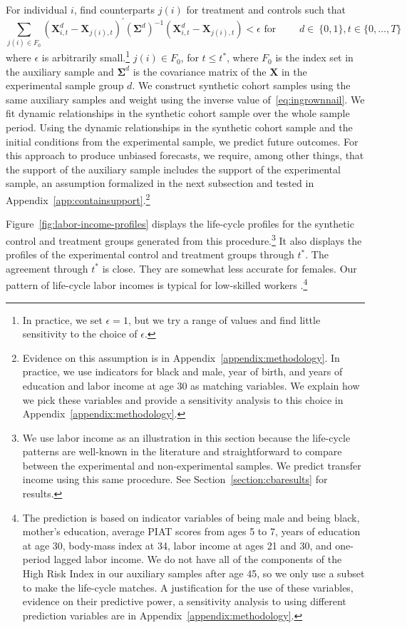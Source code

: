 For individual $i$, find counterparts $j(i)$ for treatment and controls such that
\begin{equation}\label{eq:ingrownnail}
\sum_{j(i)\in F_0} \left( \bm{X}^{d}_{i,t} - \bm{X}_{j(i),t} \right)^{\prime} {\left( \bm{\Sigma}^d\right)}^{-1} \left(\bm{X}^{d}_{i,t} - \bm{X}_{j(i),t} \right) < \epsilon \text{ for } \qquad d \in \ \{0,1\}, t \in \{0,\dots,T\}
\end{equation}
where $\epsilon$ is arbitrarily small.\footnote{In practice, we set $\epsilon = 1$, but we try a range of values and find little sensitivity to the choice of $\epsilon$.} $j(i) \in F_0$, for $t \leq t^{\ast}$, where $F_0$ is the index set in the auxiliary sample and $\bm{\Sigma}^d$ is the covariance matrix of the $\bm{X}$ in the experimental sample group $d$. We construct synthetic cohort samples using the same auxiliary samples and weight using the inverse value of~\eqref{eq:ingrownnail}. We fit dynamic relationships in the synthetic cohort sample over the whole sample period. Using the dynamic relationships in the synthetic cohort sample and the initial conditions from the experimental sample, we predict future outcomes. For this approach to produce unbiased forecasts, we require, among other things, that the support of the auxiliary sample includes the support of the experimental sample, an assumption formalized in the next subsection and tested in Appendix~\ref{app:containsupport}.\footnote{Evidence on this assumption is in Appendix~\ref{appendix:methodology}. In practice, we use indicators for black and male, year of birth, and years of education and labor income at age 30 as matching variables. We explain how we pick these variables and provide a sensitivity analysis to this choice in Appendix~\ref{appendix:methodology}.}

Figure~\ref{fig:labor-income-profiles} displays the life-cycle profiles for the synthetic control and treatment groups generated from this procedure.\footnote{We use labor income as an illustration in this section because the life-cycle patterns are well-known in the literature and straightforward to compare between the experimental and non-experimental samples. We predict transfer income using this same procedure. See Section~\ref{section:cbaresults} for results.} It also displays the profiles of the experimental control and treatment groups through $t^*$. The agreement through $t^*$ is close. They are somewhat less accurate for females. Our pattern of life-cycle labor incomes is typical for low-skilled workers \citep{Blundell-etal_2015_J-Pub-E,Gladden_Taber_2000_WageProgression,Sanders-Taber_2012_AR,Lagakos_Moll_etal_2016_LifeCycle_NBER}.\footnote{The prediction is based on indicator variables of being male and being black, mother's education, average PIAT scores from ages 5 to 7, years of education at age 30, body-mass index at 34, labor income at ages 21 and 30, and one-period lagged labor income. We do not have all of the components of the High Risk Index in our auxiliary samples after age 45, so we only use a subset to make the life-cycle matches. A justification for the use of these variables, evidence on their predictive power, a sensitivity analysis to using different prediction variables are in Appendix~\ref{appendix:methodology}.}

